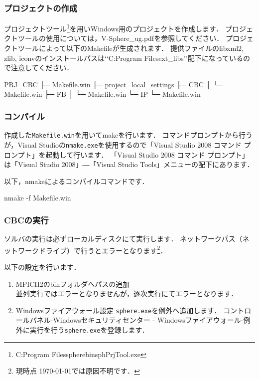 %
\subsubsection{プロジェクトの作成}
プロジェクトツール\footnote{C:{\yen}Program Files{\yen}sphere{\yen}bin{\yen}sphPrjTool.exe}を用いWindows用のプロジェクトを作成します．
プロジェクトツールの使用については，V-Sphere\_ug.pdfを参照してください．
プロジェクトツールによって以下のMakefileが生成されます．
提供ファイルのlibxml2, zlib, iconvのインストールパスは\lq\lq C:{\yen}Program Files{\yen}ext\_libs{\yen}\rq\rq 配下になっているので注意してください．

{\small
\begin{program}
PRJ_CBC
  ├─ Makefile.win
  ├─ project_local_settings
  ├─ CBC
  │    └─ Makefile.win
  ├─ FB
  │    └─ Makefile.win
  └─ IP
       └─ Makefile.win
\end{program}
}

%
\subsubsection{コンパイル}
作成した\verb|Makefile.win|を用いてmakeを行います．
コマンドプロンプトから行うが，Visual Studioの\verb|nmake.exe|を使用するので「Visual Studio 2008 コマンド プロンプト」を起動して行います．
「Visual Studio 2008 コマンド プロンプト」は「Visual Studio 2008」―「Visual Studio Tools」メニューの配下にあります．

以下，nmakeによるコンパイルコマンドです．

{\small
\begin{program}
nmake -f Makefile.win
\end{program}
}

%
\subsubsection{CBCの実行}
ソルバの実行は必ずローカルディスクにて実行します．
ネットワークパス（ネットワークドライブ）で行うとエラーとなります\footnote{現時点 \today では原因不明です．}．

以下の設定を行います．
\begin{enumerate}
\item MPICH2のbinフォルダへパスの追加\\
並列実行ではエラーとなりませんが，逐次実行にてエラーとなります．

\item Windowsファイアウォール設定
\verb|sphere.exe|を例外へ追加します．
コントロールパネル-Windowsセキュリティセンター - Windowsファイアウォール-例外に実行を行う\verb|sphere.exe|を登録します．
\end{enumerate}


